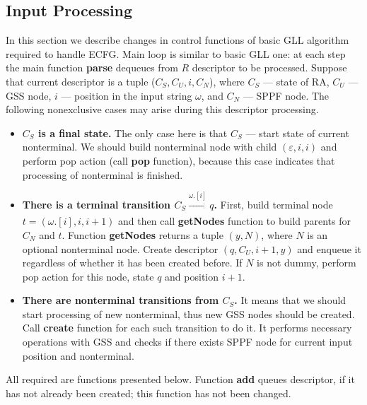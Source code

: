 \documentclass[runningheads,a4paper]{llncs}
\begin{document}
\subsection{Input Processing}%

In this section we describe changes in control functions of basic GLL algorithm required to handle ECFG.
Main loop is similar to basic GLL one: at each step the main function \textbf{parse} dequeues from $R$ descriptor to be processed.
Suppose that current descriptor is a tuple ($C_S, C_U, i, C_N$), where $C_S$ --- state of RA,
$C_U$ --- GSS node, $i$ --- position in the input string $\omega$, and $C_N$ --- SPPF node. 
The following nonexclusive cases may arise during this descriptor processing.

\begin{itemize} 
    \item \textbf{$C_S$ is a final state.} The only case here is that $C_S$ --- start state of current nonterminal. 
    We should build nonterminal node with child $(\varepsilon, i, i)$ and perform pop action
    (call \textbf{pop} function), because this case indicates that processing of nonterminal is finished.
    
    \item \textbf{There is a terminal transition $C_S \xrightarrow[]{\omega.[i]} q$.} 
    First, build terminal node $ t = (\omega.[i], i, i+1) $ and then call \textbf{getNodes} function
    to build parents for $ C_N $ and $ t $. Function \textbf{getNodes} returns a tuple $ (y, N) $, where $N$ is an optional nonterminal node.
    Create descriptor $ (q, C_U, i+1, y) $ and enqueue it regardless of whether it has been created before.
    If $ N $ is not dummy, perform pop action for this node, state $ q $ and position $i + 1 $.
    
    \item\textbf{ There are nonterminal transitions from $C_S$.}
    It means that we should start processing of new nonterminal, thus new GSS nodes should be created.
    Call \textbf{create} function for each such transition to do it.
    It performs necessary operations with GSS and checks if there exists SPPF node for current input position and nonterminal.
\end{itemize}

All required are functions presented below.
Function \textbf{add} queues descriptor, if it has not already been created; this function has not been changed.

\end{document}
